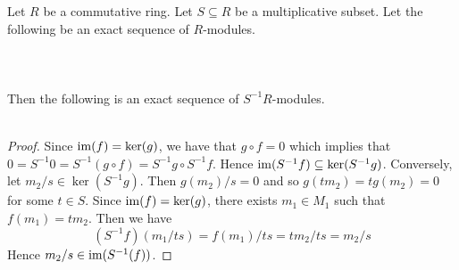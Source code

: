 \documentclass[a4paper]{article}
\begin{document}
\begin{prp}{}{} Let $R$ be a commutative ring. Let $S\subseteq R$ be a multiplicative subset. Let the following be an exact sequence of $R$-modules. \\~\\
\\~\\
Then the following is an exact sequence of $S^{-1}R$-modules. \\~\\
\begin{proof}
Since $\operatorname{im}(f)=\ker(g)$, we have that $g\circ f=0$ which implies that $0=S^{-1}0=S^{-1}(g\circ f)=S^{-1}g\circ S^{-1}f$. Hence $\operatorname{im}(S^{-1}f)\subseteq\ker(S^{-1}g)$. Conversely, let $m_2/s\in\ker(S^{-1}g)$. Then $g(m_2)/s=0$ and so $g(tm_2)=tg(m_2)=0$ for some $t\in S$. Since $\operatorname{im}(f)=\ker(g)$, there exists $m_1\in M_1$ such that $f(m_1)=tm_2$. Then we have $$(S^{-1}f)(m_1/ts)=f(m_1)/ts=tm_2/ts=m_2/s$$ Hence $m_2/s\in\operatorname{im}(S^{-1}(f))$. 
\end{proof}
\end{prp}
\end{document}
